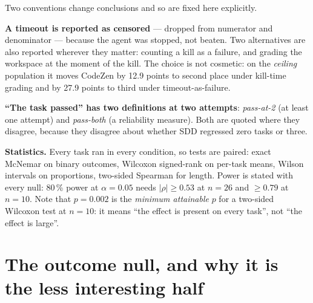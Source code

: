 \documentclass[11pt,a4paper]{article}
\begin{document}
Two conventions change conclusions and so are fixed here explicitly.

\textbf{A timeout is reported as censored} --- dropped from numerator and denominator ---
because the agent was stopped, not beaten. Two alternatives are also reported wherever they
matter: counting a kill as a failure, and grading the workspace at the moment of the kill. The
choice is not cosmetic: on the \emph{ceiling} population it moves CodeZen by 12.9 points to
second place under kill-time grading and by 27.9 points to third under timeout-as-failure.

\textbf{``The task passed'' has two definitions at two attempts}: \emph{pass-at-2} (at least
one attempt) and \emph{pass-both} (a reliability measure). Both are quoted where they
disagree, because they disagree about whether SDD regressed zero tasks or three.

\textbf{Statistics.} Every task ran in every condition, so tests are paired: exact McNemar on
binary outcomes, Wilcoxon signed-rank on per-task means, Wilson intervals on proportions,
two-sided Spearman for length. Power is stated with every null: 80\,\% power at
$\alpha = 0.05$ needs $|\rho| \ge 0.53$ at $n = 26$ and $\ge 0.79$ at $n = 10$. Note that
$p = 0.002$ is the \emph{minimum attainable} $p$ for a two-sided Wilcoxon test at $n = 10$: it
means ``the effect is present on every task'', not ``the effect is large''.

\clearpage
\section{The outcome null, and why it is the less interesting half}
\label{sec:outcome}

\begin{table}[htbp]
\centering
\caption{Outcome at three resolutions, both runs, under all three censoring conventions.
\textbf{1} drops censored trials from numerator and denominator (the success column and its
Wilson interval); \textbf{2} puts every trial in the denominator with graded passes only in
the numerator; \textbf{3} puts every trial in the denominator and lets a censored trial keep
the reward the verifier assigned it. Columns 2 and 3 differ by exactly the
censored-but-passing trials. Partial credit is over every trial that has a per-test record:
31 of 32 for \emph{suite} baseline, complete everywhere else. Test rate pools verifier tests,
which are clustered within tasks.}
\label{tab:outcome}
\small

\end{table}
\end{document}
